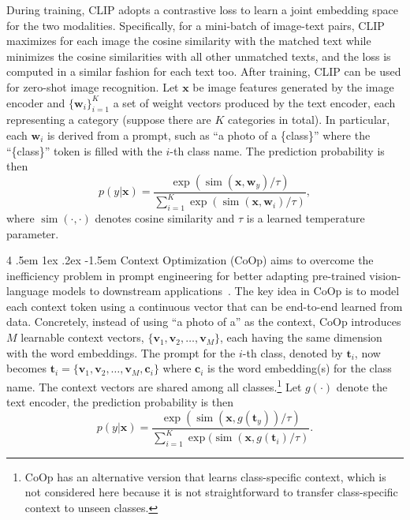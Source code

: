 \documentclass[10pt,twocolumn,letterpaper]{article}
\makeatletter
\renewcommand\paragraph{
  \@startsection{paragraph} {4} {\z@} {.5em \@plus1ex \@minus.2ex} {-1.5em} {\normalfont\normalsize\bfseries} }
\makeatother
\begin{document}
During training, CLIP adopts a contrastive loss to learn a joint embedding space for the two modalities. Specifically, for a mini-batch of image-text pairs, CLIP maximizes for each image the cosine similarity with the matched text while minimizes the cosine similarities with all other unmatched texts, and the loss is computed in a similar fashion for each text too. After training, CLIP can be used for zero-shot image recognition. Let $\bm{x}$ be image features generated by the image encoder and $\{\bm{w}_i\}_{i=1}^K$ a set of weight vectors produced by the text encoder, each representing a category (suppose there are $K$ categories in total). In particular, each $\bm{w}_i$ is derived from a prompt, such as ``a photo of a \{class\}'' where the ``\{class\}'' token is filled with the $i$-th class name. The prediction probability is then
\begin{equation} \label{eq:pred_zs}
p(y | \bm{x}) = \frac{\exp (\operatorname{sim} (\bm{x}, \bm{w}_y) / \tau)}{\sum_{i=1}^K \exp (\operatorname{sim} (\bm{x}, \bm{w}_i) / \tau)},
\end{equation}
where $\operatorname{sim}(\cdot, \cdot)$ denotes cosine similarity and $\tau$ is a learned temperature parameter.

\paragraph{Context Optimization (CoOp)}
aims to overcome the inefficiency problem in prompt engineering for better adapting pre-trained vision-language models to downstream applications~\cite{zhou2021coop}. The key idea in CoOp is to model each context token using a continuous vector that can be end-to-end learned from data. Concretely, instead of using ``a photo of a'' as the context, CoOp introduces $M$ learnable context vectors, $\{\bm{v}_1, \bm{v}_2, \hdots, \bm{v}_M\}$, each having the same dimension with the word embeddings. The prompt for the $i$-th class, denoted by $\bm{t}_i$, now becomes $\bm{t}_i =\{\bm{v}_1, \bm{v}_2, \hdots, \bm{v}_M, \bm{c}_i\}$ where $\bm{c}_i$ is the word embedding(s) for the class name. The context vectors are shared among all classes.\footnote{CoOp has an alternative version that learns class-specific context, which is not considered here because it is not straightforward to transfer class-specific context to unseen classes.} Let $g(\cdot)$ denote the text encoder, the prediction probability is then
\begin{equation} \label{eq:pred_coop}
p(y | \bm{x}) = \frac{\exp (\operatorname{sim} (\bm{x}, g(\bm{t}_y)) / \tau)}{\sum_{i=1}^K \exp (\operatorname{sim} (\bm{x}, g(\bm{t}_i) / \tau)}.
\end{equation}
\end{document}

